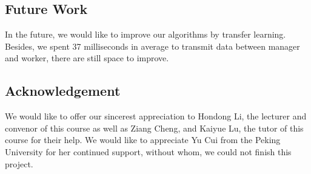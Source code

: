 \documentclass[runningheads]{llncs}
\begin{document}
\subsection{Future Work}

In the future, we would like to improve our algorithms by 
transfer learning. Besides, we spent 37 milliseconds in 
average to transmit data between manager and worker, there 
are still space to improve. 

\subsection{Acknowledgement}
We would like to offer our sincerest appreciation to 
Hondong Li, the lecturer and convenor of this course as 
well as Ziang Cheng, and Kaiyue Lu, the tutor of this 
course for their help. We would like to appreciate 
Yu Cui from the Peking University for her continued support, 
without whom, we could not finish this project. 
\end{document}
